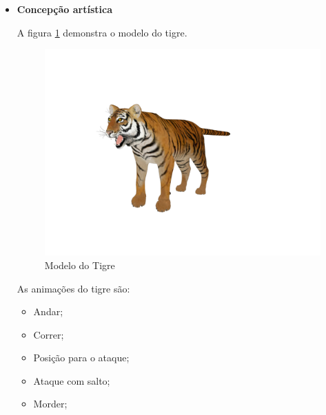 \begin{itemize}
\item {\bf Concepção artística}

A figura \ref{img:tigre} demonstra o modelo do tigre.
\newpage
\begin{figure}[H]
 \centering
 \includegraphics[scale=0.3]{Imagens/tigre01.png}
 \caption{Modelo do Tigre}
\label{img:tigre}
\end{figure}

As animações do tigre são:
\begin{itemize}
\item {Andar;}
\item {Correr;}
\item {Posição para o ataque;}
\item {Ataque com salto;}
\item {Morder;}
\end{itemize}
\end{itemize}

